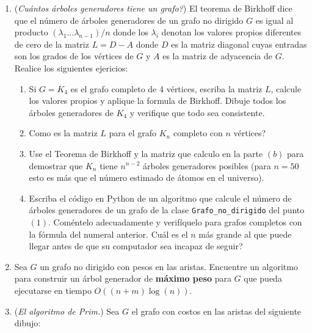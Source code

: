 \documentclass[12pt, a4paper]{article}
\begin{document}
\begin{enumerate}
\item ({\it Cuántos árboles generadores tiene un grafo?}) El teorema de Birkhoff dice que el número de árboles generadores de un grafo no dirigido $G$ es igual al producto $(\lambda_1\dots\lambda_{n-1})/n$ donde los $\lambda_i$ denotan los valores propios diferentes de cero de la matriz $L=D-A$ donde $D$ es la matriz diagonal cuyas entradas son los grados de los vértices de $G$ y $A$ es la matriz de adyacencia de $G$. Realice los siguientes ejericios:
\begin{enumerate}
\item Si $G=K_4$ es el grafo completo de $4$ vértices, escriba la matriz $L$, calcule los valores propios y aplique la formula de Birkhoff. Dibuje todos los árboles generadores de $K_4$ y verifique que todo sea consistente.
\item Como es la matriz $L$ para el grafo $K_n$ completo con $n$ vértices?
\item Use el Teorema de Birkhoff y la matriz que calculo en la parte $(b)$ para demostrar que $K_n$ tiene $n^{n-2}$ árboles generadores posibles (para $n=50$ esto es más que el número estimado de átomos en el universo).
\item Escriba el código en Python de un algoritmo que calcule el número de árboles generadores de un grafo de la clase \verb!Grafo_no_dirigido! del punto $(1)$. Coméntelo adecuadamente y verifíquelo para grafos completos con la fórmula del numeral anterior. Cuál es el $n$ más grande al que puede llegar antes de que su computador sea incapaz de seguir?
\end{enumerate}
\item Sea $G$ un grafo no dirigido con pesos en las aristas. Encuentre un algoritmo para construir un árbol generador de {\bf máximo peso} para $G$ que pueda ejecutarse en tiempo $O((n+m)\log(n))$.
\newpage
\item ({\it El algoritmo de Prim.}) Sea $G$ el grafo con costos en las aristas del siguiente dibujo:
\begin{center}

\end{center}
\end{enumerate}
\end{document}
